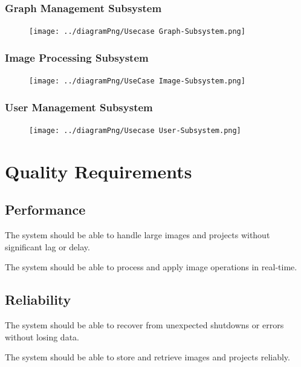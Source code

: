 \documentclass[11pt,a4paper]{article}
\begin{document}
\subsubsection*{Graph Management Subsystem}
\begin{figure}[htbp]
    \centering
    \texttt{[image: ../diagramPng/Usecase Graph-Subsystem.png]}
\end{figure}

\pagebreak
\subsubsection*{Image Processing Subsystem}
\begin{figure}[htbp]
    \centering
    \texttt{[image: ../diagramPng/UseCase Image-Subsystem.png]}
\end{figure}

\subsubsection*{User Management Subsystem}
\begin{figure}[htbp]
    \centering
    \texttt{[image: ../diagramPng/Usecase User-Subsystem.png]}
\end{figure}


\pagebreak

\section*{Quality Requirements}

\subsection*{Performance}

The system should be able to handle large images and projects without
significant lag or delay.

The system should be able to process and apply image operations in real-time.

\subsection*{Reliability} 

The system should be able to recover from unexpected shutdowns or errors without
losing data.

The system should be able to store and retrieve images and projects reliably.
\end{document}
